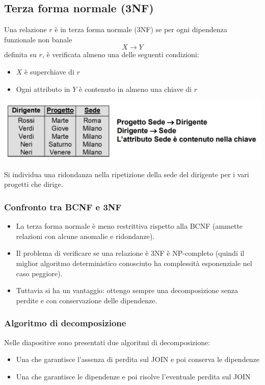 \subsection{Terza forma normale (3NF)}
Una relazione $r$ è in terza forma normale (3NF) se per ogni dipendenza funzionale non banale
\[X \to Y\]
definita su $r$, è verificata almeno una delle seguenti condizioni:
\begin{itemize}
	\item $X$ è superchiave di $r$
	\item Ogni attributo in $Y$ è contenuto in almeno una chiave di $r$
\end{itemize}
\begin{center}
	\includegraphics{images/183.PNG}
\end{center}
Si individua una ridondanza nella ripetizione della sede del dirigente per i vari progetti che dirige. 
\subsubsection{Confronto tra BCNF e 3NF}
\begin{itemize}
	\item La terza forma normale è meno restrittiva rispetto alla BCNF (ammette relazioni con alcune anomalie e ridondanze).
	\item Il problema di verificare se una relazione è 3NF è NP-completo (quindi il miglior algoritmo deterministico conosciuto ha complessità esponenziale nel caso peggiore).
	\item Tuttavia si ha un vantaggio: ottengo sempre una decomposizione senza perdite e con conservazione delle dipendenze.
\end{itemize}
\subsubsection{Algoritmo di decomposizione}
Nelle diapositive sono presentati due algoritmi di decomposizione:
\begin{itemize}
	\item Una che garantisce l'assenza di perdita sul JOIN e poi conserva le dipendenze
	\item Una che garantisce le dipendenze e poi risolve l'eventuale perdita sul JOIN
\end{itemize}

